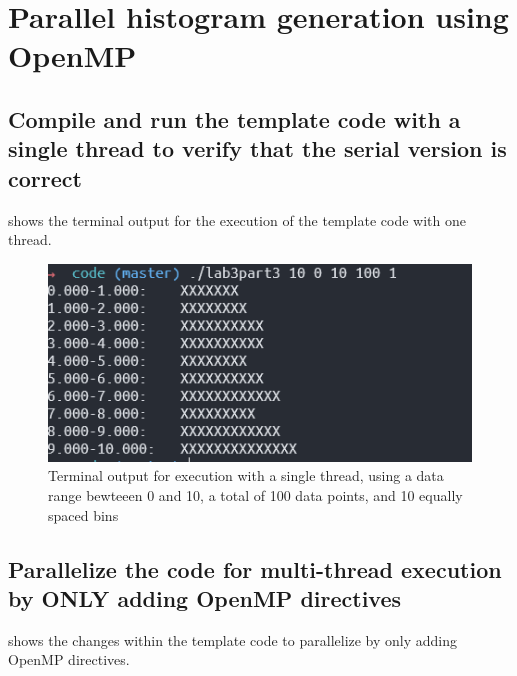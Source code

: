 
\section{Parallel histogram generation using OpenMP}

\subsection{Compile and run the template code with a single thread to verify
that the serial version is correct}

 shows the terminal output for the execution of the template
code with one thread. 

\begin{figure}[ht]
	\centering
	\includegraphics[width=\textwidth]{graphics/P3_a_terminal_output.PNG}
	\caption{Terminal output for execution with a single thread, using a 
	data range bewteeen 0 and 10, a total of 100 data points, and 10 equally
	spaced bins}
	\label{fig:lab3part3a}
\end{figure}

\subsection{Parallelize the code for multi-thread execution by ONLY adding OpenMP
directives}

 shows the changes within the template code to parallelize
by only adding OpenMP directives.

\vspace{0.5cm}


